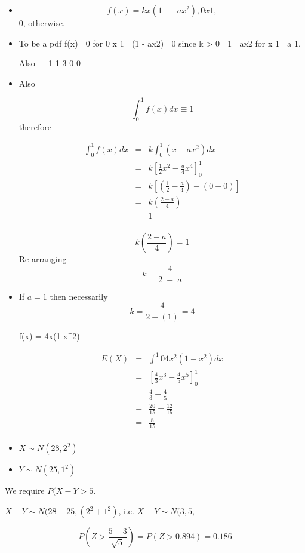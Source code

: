 \documentclass[a4paper,12pt]{article}
\begin{document}
\begin{itemize}
    \item 

\[f(x) = kx(1 \;-\; ax^2), 0 
 x 
 1,\]
0, otherwise.
\item To be a pdf f(x)  0 for 0 
 x 
 1  (1 \;-\; ax2)  0 since k > 0
 1  ax2 for x 
 1  a 
 1.

Also \;-\; 
1 1 3
0 0
\item 
Also

\[ \int^{1}_{0} f ( x ) dx \equiv 1\] therefore 

\begin{eqnarray*}
\int^{1}_{0} f ( x ) dx &=&  k \int^{1}_{0} ( x - ax^2) dx \\ 
&=& k \left[ \frac{1}{2}x^2 - \frac{a}{4}x^4\right]^{1}_{0} \\
&=& k \left[ \left( \frac{1}{2} - \frac{a}{4} \right) - \left( 0 - 0 \right) \right] \\
&=& k \left( \frac{2-a}{4} \right) \\
&=& 1 \\
\end{eqnarray*}
 
\[  k \left( \frac{2-a}{4} \right) = 1 \]
Re-arranging \[ k = \frac{4}{2 \;-\; a} \]

\item 
If $a=1$ then necessarily \[ k = \frac{4}{2-(1)} = 4\]

f(x) = 4x(1-x^2)

\begin{eqnarray*}
E(X) &=& \int^{1}{0} 4x^2(1-x^2) dx \\
&=& \left[ \frac{4}{3}x^3 - \frac{4}{5}x^5 \right]^{1}_{0}\\
&=&  \frac{4}{3} -  \frac{4}{5}\\
&=&  \frac{20}{15} -  \frac{12}{15}\\
&=& \frac{8}{15}\\
\end{eqnarray*}
\end{itemize}
\begin{itemize}
\item $X \sim N(28,2^2)$
\item $Y \sim N(25,1^2)$
\end{itemize}

We require $P(X-Y >5$.

$X-Y \sim N(28-25, (2^2 + 1^2)$, i.e. $X-Y \sim N(3, 5$,

\[P\left( Z > \frac{5-3}{\sqrt{5}} \right) = P(Z > 0.894) = 0.186\]
\end{document}
